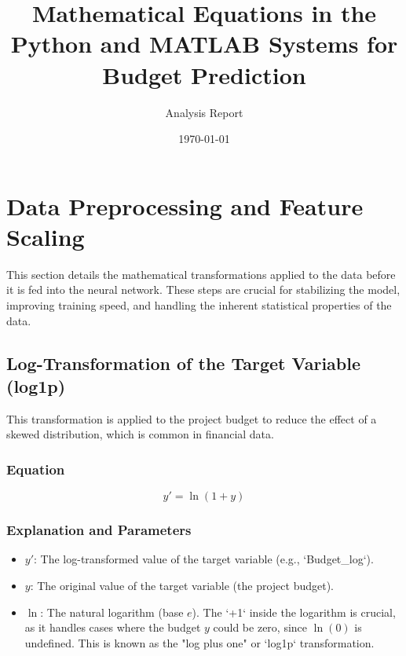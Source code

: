 \documentclass[12pt, a4paper]{article}
\begin{document}
\title{Mathematical Equations in the Python and MATLAB Systems for Budget Prediction}
\author{Analysis Report}
\date{\today}
\maketitle
\tableofcontents
\newpage

\section{Data Preprocessing and Feature Scaling}
This section details the mathematical transformations applied to the data before it is fed into the neural network. These steps are crucial for stabilizing the model, improving training speed, and handling the inherent statistical properties of the data.

\subsection{Log-Transformation of the Target Variable (log1p)}
This transformation is applied to the project budget to reduce the effect of a skewed distribution, which is common in financial data.

\subsubsection{Equation}
\begin{equation}
y' = \ln(1 + y)
\label{eq:log1p}
\end{equation}

\subsubsection{Explanation and Parameters}
\begin{itemize}
    \item \textbf{$y'$}: The log-transformed value of the target variable (e.g., `Budget\_log`).
    \item \textbf{$y$}: The original value of the target variable (the project budget).
    \item \textbf{$\ln$}: The natural logarithm (base $e$). The `+1` inside the logarithm is crucial, as it handles cases where the budget $y$ could be zero, since $\ln(0)$ is undefined. This is known as the "log plus one" or `log1p` transformation.
\end{itemize}
\end{document}
